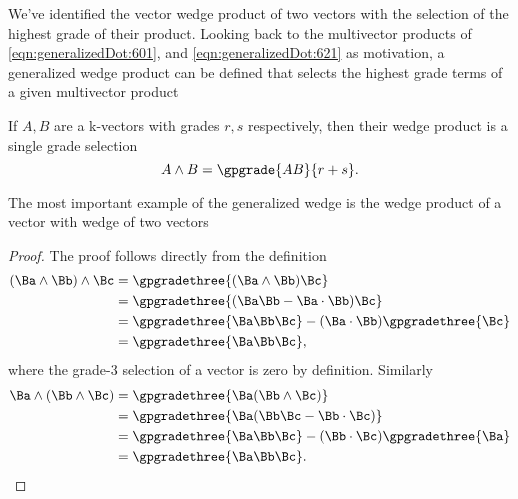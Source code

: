 %
%
We've identified the vector wedge product of two vectors with the selection of the highest grade of their product.
Looking back to the multivector products of \cref{eqn:generalizedDot:601}, and \cref{eqn:generalizedDot:621} as motivation,
a generalized wedge product can be defined that selects the highest grade terms of a given multivector product


If \( A, B \) are a k-vectors with grades \( r, s \) respectively, then their wedge product is a single grade selection
\begin{equation}\label{eqn:generalizedWedge:560}
A \wedge B = \gpgrade{ A B }{ r + s}.
\end{equation}

The most important example of the generalized wedge is the wedge product of a vector with wedge of two vectors

\begin{proof}
The proof follows directly from the definition
\begin{equation}\label{eqn:generalizedWedge:580}
\begin{aligned}
(\Ba \wedge \Bb) \wedge \Bc
&= \gpgradethree{ (\Ba \wedge \Bb) \Bc } \\
&= \gpgradethree{ (\Ba \Bb -\Ba \cdot \Bb) \Bc } \\
&= \gpgradethree{ \Ba \Bb \Bc } - (\Ba \cdot \Bb) \gpgradethree{ \Bc } \\
&= \gpgradethree{ \Ba \Bb \Bc },
\end{aligned}
\end{equation}
where the grade-3 selection of a vector is zero by definition.
Similarly
\begin{equation}\label{eqn:generalizedWedge:600}
\begin{aligned}
\Ba \wedge (\Bb \wedge \Bc)
&= \gpgradethree{ \Ba (\Bb \wedge \Bc) } \\
&= \gpgradethree{ \Ba (\Bb \Bc - \Bb \cdot \Bc) } \\
&= \gpgradethree{ \Ba \Bb \Bc } - (\Bb \cdot \Bc) \gpgradethree{ \Ba } \\
&= \gpgradethree{ \Ba \Bb \Bc }.
\end{aligned}
\end{equation}
\end{proof}

